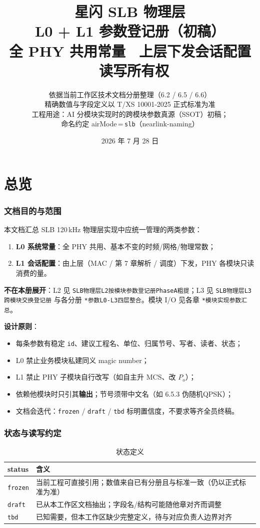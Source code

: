 \documentclass[11pt,a4paper]{ctexart}
\title{%
  \textbf{星闪 SLB 物理层}\\[0.35em]
  \Large L0 + L1 参数登记册（初稿）\\[0.25em]
  \large 全 PHY 共用常量 \textbullet\ 上层下发会话配置 \textbullet\ 读写所有权
}
\author{依据当前工作区技术文档分册整理（6.2 / 6.5 / 6.6）\\
精确数值与字段定义以 T/XS 10001-2025 正式标准为准\\[0.3em]
\small 工程用途：AI 分模块实现时的跨模块参数真源（SSOT）初稿；\\
\small 命名约定 airMode\,=\,\texttt{slb}（nearlink-naming）
}
\date{2026 年 7 月 28 日}
\begin{document}
\maketitle
\tableofcontents
\newpage

\part{总览}

\section{文档目的与范围}

本文档汇总 SLB 120\,kHz 物理层实现中应统一管理的两类参数：

\begin{enumerate}[nosep]
  \item \textbf{L0 系统常量}：全 PHY 共用、基本不变的时频/网格/物理常数；
  \item \textbf{L1 会话配置}：由上层（MAC / 第 7 章解析 / 调度）下发，PHY 各模块只读消费的量。
\end{enumerate}

\textbf{不在本册展开}：L2 见 \texttt{SLB物理层L2按模块参数登记册PhaseA粗提}；L3 见 \texttt{SLB物理层L3跨模块交换登记册} 与各分册 \texttt{*参数L0-L3四层整合}。模块 I/O 见各章 \texttt{*模块实现参数汇总}。

\textbf{设计原则}：
\begin{itemize}[nosep]
  \item 每条参数有稳定 \texttt{id}、建议工程名、单位、归属节号、写者、读者、状态；
  \item L0 禁止业务模块私建同义 magic number；
  \item L1 禁止 PHY 子模块自行改写（如自主升 MCS、改 $P_o$）；
  \item 依赖他模块时只引其\textbf{输出}；节号须带中文名（如 6.5.3 伪随机QPSK）；
  \item 文档会迭代：\texttt{frozen} / \texttt{draft} / \texttt{tbd} 标明置信度，不要求等齐全员终稿。
\end{itemize}

\section{状态与读写约定}

\begin{longtable}{L{2.2cm}L{12.5cm}}
\caption{状态定义\label{tab:status}} \\
\toprule
\textbf{status} & \textbf{含义} \\
\midrule
\texttt{frozen} & 当前工程可直接引用；数值来自已有分册且与标准一致（仍以正式标准为准） \\
\texttt{draft} & 已从本工作区文档抽出；字段名/结构可能随他章对齐而调整 \\
\texttt{tbd} & 已知需要，但本工作区缺少完整定义，待与对应负责人边界对齐 \\
\bottomrule
\end{longtable}
\end{document}
